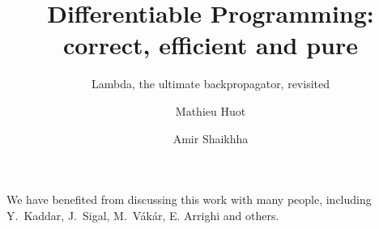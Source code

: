 \documentclass[acmsmall,anonymous]{acmart}\settopmatter{printfolios=true,printccs=false,printacmref=false}
\begin{document}
\title{Differentiable Programming: correct, efficient and pure}
\subtitle{Lambda, the ultimate backpropagator, revisited}

\author{Mathieu Huot}

\author{Amir Shaikhha}



\renewcommand{\shortauthors}{Huot, et al.}





\maketitle







\begin{acks}
We have benefited from discussing this work with many people, including Y.~Kaddar, J.~Sigal, M.~V\'ak\'ar, E. Arrighi and others. 
\end{acks}

% 
\end{document}

